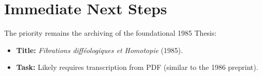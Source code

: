 \documentclass[11pt]{article}
\begin{document}
\section{Immediate Next Steps}
The priority remains the archiving of the foundational 1985 Thesis:
\begin{itemize}
    \item \textbf{Title:} \emph{Fibrations difféologiques et Homotopie} (1985).
    \item \textbf{Task:} Likely requires transcription from PDF (similar to the 1986 preprint).
\end{itemize}
\end{document}
